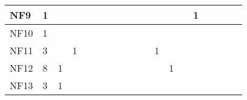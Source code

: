 \begin{table}[]
{\begin{tabular}{|l|l|l|l|l|l|l|l|l|l|l|l|l|l|l|l|l|l|l|}
NF9  & 1                                                     &                                                  &    &    &    &    &                                                  &    &    &    &    &                                                   &    & 1                                                 &    &                                                             &                                                             &                                                             \\ \hline
NF10 & 1                                                     &                                                  &    &    &    &    &                                                  &    &    &    &    &                                                   &    &                                                   &    &                                                             &                                                             &                                                             \\ \hline
NF11 & 3                                                     &                                                  & 1  &    &    &    &                                                  &    &    &    & 1  &                                                   &    &                                                   &    &                                                             &                                                             &                                                             \\ \hline
NF12 & 8                                                     & 1                                                &    &    &    &    &                                                  &    &    &    &    & 1                                                 &    &                                                   &    &                                                             &                                                             &                                                             \\ \hline
NF13 & 3                                                     & 1                                                &    &    &    &    &                                                  &    &    &    &    &                                                   &    &                                                   &    &                                                             &                                                             &                                                             \\ \hline

\end{tabular}}
\end{table}
